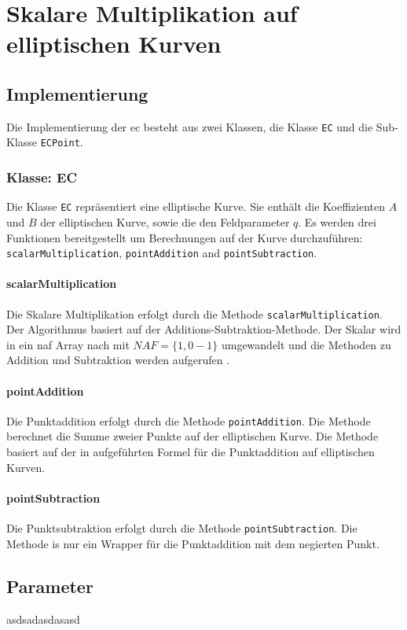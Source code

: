 \chapter{Skalare Multiplikation auf elliptischen Kurven}

\section{Implementierung}
Die Implementierung der \gls{ec} besteht aus zwei Klassen, die Klasse \texttt{EC} und die Sub-Klasse \texttt{ECPoint}.

\subsection{Klasse: EC}
Die Klasse \texttt{EC} repräsentiert eine elliptische Kurve. Sie enthält die Koeffizienten $A$ und $B$ der elliptischen Kurve, sowie die den Feldparameter $q$. Es werden drei Funktionen bereitgestellt um Berechnungen auf der Kurve durchzuführen: \texttt{scalarMultiplication}, \texttt{pointAddition} and \texttt{pointSubtraction}.

\subsubsection{scalarMultiplication}
Die Skalare Multiplikation erfolgt durch die Methode \texttt{scalarMultiplication}. Der Algorithmus basiert auf der Additions-Subtraktion-Methode. Der Skalar wird in ein \gls{naf} Array nach \cite{enwiki:1153415896} mit $NAF = \{1,0-1\}$ umgewandelt und die Methoden zu Addition und Subtraktion werden aufgerufen \cite{891000}.

\subsubsection{pointAddition}
Die Punktaddition erfolgt durch die Methode \texttt{pointAddition}. Die Methode berechnet die Summe zweier Punkte auf der elliptischen Kurve. Die Methode basiert auf der in \cite{891000} aufgeführten Formel für die Punktaddition auf elliptischen Kurven.

\subsubsection{pointSubtraction}
Die Punktsubtraktion erfolgt durch die Methode \texttt{pointSubtraction}. Die Methode is nur ein Wrapper für die Punktaddition mit dem negierten Punkt.

\section{Parameter}
asdsadasdasasd


